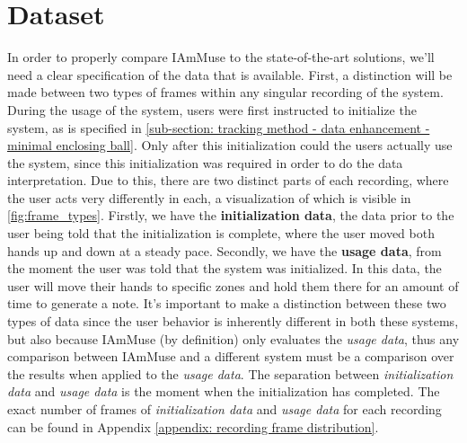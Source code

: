 
\section{Dataset}
\label{section: setup baseline dataset - dataset}


In order to properly compare IAmMuse to the state-of-the-art solutions, we'll need a clear specification of the data that is available.
First, a distinction will be made between two types of frames within any singular recording of the system.
During the usage of the system, users were first instructed to initialize the system, as is specified in \cref{sub-section: tracking method - data enhancement - minimal enclosing ball}.
Only after this initialization could the users actually use the system, since this initialization was required in order to do the data interpretation. 
Due to this, there are two distinct parts of each recording, where the user acts very differently in each, a visualization of which is visible in \cref{fig:frame_types}.
Firstly, we have the \textbf{initialization data}, the data prior to the user being told that the initialization is complete, where the user moved both hands up and down at a steady pace.
Secondly, we have the \textbf{usage data}, from the moment the user was told that the system was initialized. 
In this data, the user will move their hands to specific zones and hold them there for an amount of time to generate a note.
It's important to make a distinction between these two types of data since the user behavior is inherently different in both these systems, but also because IAmMuse (by definition) only evaluates the \textit{usage data}, thus any comparison between IAmMuse and a different system must be a comparison over the results when applied to the \textit{usage data}.
The separation between \textit{initialization data} and \textit{usage data} is the moment when the initialization has completed.
The exact number of frames of \textit{initialization data} and \textit{usage data} for each recording can be found in Appendix \ref{appendix: recording frame distribution}.


